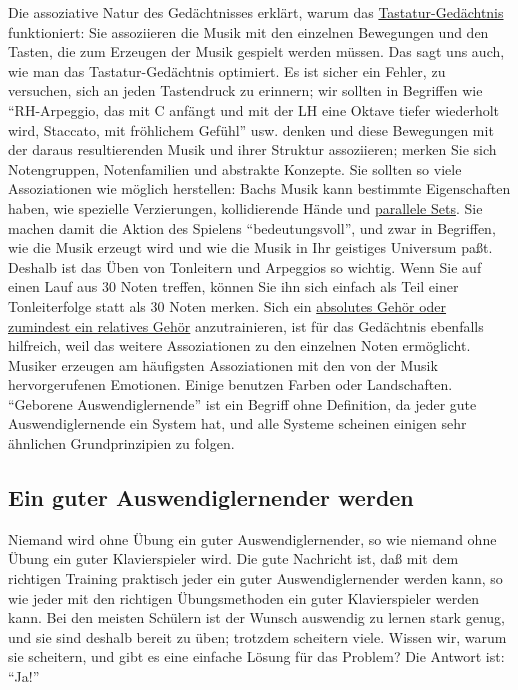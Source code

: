 Die assoziative Natur des Gedächtnisses erklärt, warum das \hyperlink{c1iii6tastatur}{Tastatur-Gedächtnis} funktioniert: Sie assoziieren die Musik mit den einzelnen Bewegungen und den Tasten, die zum Erzeugen der Musik gespielt werden müssen.
Das sagt uns auch, wie man das Tastatur-Gedächtnis optimiert.
Es ist sicher ein Fehler, zu versuchen, sich an jeden Tastendruck zu erinnern; wir sollten in Begriffen wie \enquote{RH-Arpeggio, das mit C anfängt und mit der LH eine Oktave tiefer wiederholt wird, Staccato, mit fröhlichem Gefühl} usw. denken und diese Bewegungen mit der daraus resultierenden Musik und ihrer Struktur assoziieren; merken Sie sich Notengruppen, Notenfamilien und abstrakte Konzepte.
Sie sollten so viele Assoziationen wie möglich herstellen: Bachs Musik kann bestimmte Eigenschaften haben, wie spezielle Verzierungen, kollidierende Hände und \hyperlink{c1ii11}{parallele Sets}.
Sie machen damit die Aktion des Spielens \enquote{bedeutungsvoll}, und zwar in Begriffen, wie die Musik erzeugt wird und wie die Musik in Ihr geistiges Universum paßt.
Deshalb ist das Üben von Tonleitern und Arpeggios so wichtig.
Wenn Sie auf einen Lauf aus 30 Noten treffen, können Sie ihn sich einfach als Teil einer Tonleiterfolge statt als 30 Noten merken.
Sich ein \hyperlink{c1iii12}{absolutes Gehör oder zumindest ein relatives Gehör} anzutrainieren, ist für das Gedächtnis ebenfalls hilfreich, weil das weitere Assoziationen zu den einzelnen Noten ermöglicht.
Musiker erzeugen am häufigsten Assoziationen mit den von der Musik hervorgerufenen Emotionen.
Einige benutzen Farben oder Landschaften.
\enquote{Geborene Auswendiglernende} ist ein Begriff ohne Definition, da jeder gute Auswendiglernende ein System hat, und alle Systeme scheinen einigen sehr ähnlichen Grundprinzipien zu folgen.


\subsection{Ein guter Auswendiglernender werden}\hypertarget{c1iii6n}{}

Niemand wird ohne Übung ein guter Auswendiglernender, so wie niemand ohne Übung ein guter Klavierspieler wird.
Die gute Nachricht ist, daß mit dem richtigen Training praktisch jeder ein guter Auswendiglernender werden kann, so wie jeder mit den richtigen Übungsmethoden ein guter Klavierspieler werden kann.
Bei den meisten Schülern ist der Wunsch auswendig zu lernen stark genug, und sie sind deshalb bereit zu üben; trotzdem scheitern viele.
Wissen wir, warum sie scheitern, und gibt es eine einfache Lösung für das Problem?
Die Antwort ist: \enquote{Ja!}

